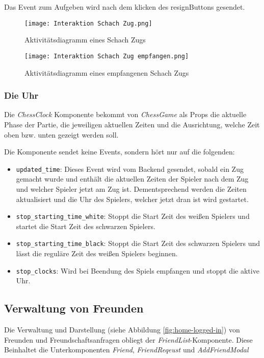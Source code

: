 Das Event zum Aufgeben wird nach dem klicken des \glqq resign\grqq{ }Buttons gesendet.


      \begin{figure}[h]
      \centering
  \texttt{[image: Interaktion Schach Zug.png]}
  \caption{Aktivitätsdiagramm eines Schach Zugs}
  \label{fig:chess-move}
\end{figure}

      \begin{figure}[h]
      \centering
  \texttt{[image: Interaktion Schach Zug empfangen.png]}
  \caption{Aktivitätsdiagramm eines empfangenen Schach Zugs}
  \label{fig:chess-opponent-move}
\end{figure}

        \subsubsection{Die Uhr}
Die \textit{ChessClock} Komponente bekommt von \textit{ChessGame} als Props die aktuelle Phase der Partie, die jeweiligen aktuellen Zeiten und die Ausrichtung, welche Zeit oben bzw. unten gezeigt werden soll.

Die Komponente sendet keine Events, sondern hört nur auf die folgenden:
\begin{itemize}
\item \verb|updated_time|: Dieses Event wird vom Backend gesendet, sobald ein Zug gemacht wurde und enthält die aktuellen Zeiten der Spieler nach dem Zug und welcher Spieler jetzt am Zug ist. Dementsprechend werden die Zeiten aktualisiert und die Uhr des Spielers, welcher jetzt dran ist wird gestartet.
\item \verb|stop_starting_time_white|: Stoppt die Start Zeit des weißen Spielers und startet die Start Zeit des schwarzen Spielers.
\item \verb|stop_starting_time_black|: Stoppt die Start Zeit des schwarzen Spielers und lässt die reguläre Zeit des weißen Spielers beginnen.
\item \verb|stop_clocks|: Wird bei Beendung des Spiels empfangen und stoppt die aktive Uhr.
\end{itemize}

\subsection{Verwaltung von Freunden}
\label{sec:Friends}
Die Verwaltung und Darstellung (siehe Abbildung \ref{fig:home-logged-in}) von Freunden und Freundschaftsanfragen obliegt der \textit{FriendList}-Komponente. Diese Beinhaltet die Unterkomponenten \textit{Friend}, \textit{FriendReqeust} und \textit{AddFriendModal}

